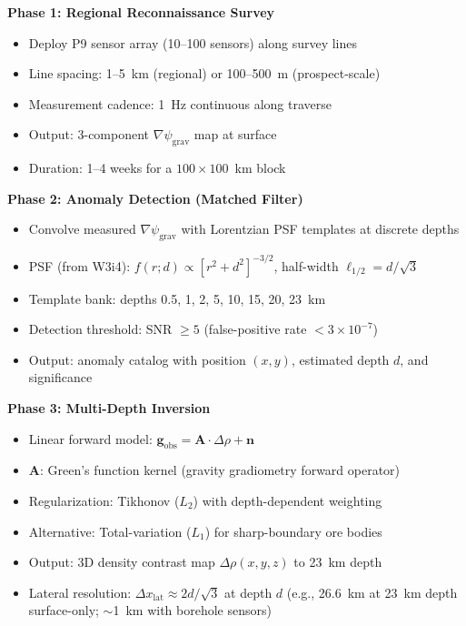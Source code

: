 \documentclass[11pt]{article}
\theoremstyle{definition}
\theoremstyle{remark}
\newcommand{\ee}[1]{\times10^{#1}}
\newcommand{\psigrav}{\psi_{\mathrm{grav}}}
\newcommand{\drho}{\Delta\rho}
\begin{document}
\begin{tcolorbox}[colback=green!5!white, colframe=green!40!black,
  title=\textbf{P9 Geological Survey Protocol --- Five Phases}]

\textbf{Phase 1: Regional Reconnaissance Survey}
\begin{itemize}[nosep]
\item Deploy P9 sensor array (10--100 sensors) along survey lines
\item Line spacing: 1--5~km (regional) or 100--500~m (prospect-scale)
\item Measurement cadence: 1~Hz continuous along traverse
\item Output: 3-component $\nabla\psigrav$ map at surface
\item Duration: 1--4 weeks for a $100\times100$~km block
\end{itemize}

\textbf{Phase 2: Anomaly Detection (Matched Filter)}
\begin{itemize}[nosep]
\item Convolve measured $\nabla\psigrav$ with Lorentzian PSF templates at discrete depths
\item PSF (from W3i4): $f(r; d) \propto [r^2 + d^2]^{-3/2}$, half-width $\ell_{1/2} = d/\sqrt{3}$
\item Template bank: depths 0.5, 1, 2, 5, 10, 15, 20, 23~km
\item Detection threshold: SNR $\geq 5$ (false-positive rate $< 3\ee{-7}$)
\item Output: anomaly catalog with position $(x, y)$, estimated depth $d$, and significance
\end{itemize}

\textbf{Phase 3: Multi-Depth Inversion}
\begin{itemize}[nosep]
\item Linear forward model: $\mathbf{g}_{\mathrm{obs}} = \mathbf{A} \cdot \drho + \mathbf{n}$
\item $\mathbf{A}$: Green's function kernel (gravity gradiometry forward operator)
\item Regularization: Tikhonov ($L_2$) with depth-dependent weighting
\item Alternative: Total-variation ($L_1$) for sharp-boundary ore bodies
\item Output: 3D density contrast map $\drho(x, y, z)$ to 23~km depth
\item Lateral resolution: $\Delta x_{\mathrm{lat}} \approx 2d/\sqrt{3}$ at depth $d$
  (e.g., 26.6~km at 23~km depth surface-only; $\sim$1~km with borehole sensors)
\end{itemize}


\end{tcolorbox}
\end{document}
